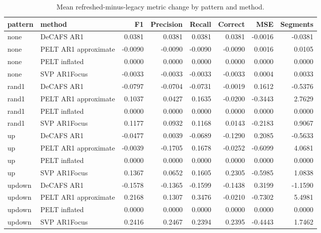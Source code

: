 \begin{table}

\caption{Mean refreshed-minus-legacy metric change by pattern and method.}
\centering
\begin{tabular}[t]{llrrrrrr}
\toprule
pattern & method & F1 & Precision & Recall & Correct & MSE & Segments\\
\midrule
none & DeCAFS AR1 & 0.0381 & 0.0381 & 0.0381 & 0.0381 & -0.0016 & -0.0381\\
none & PELT AR1 approximate & -0.0090 & -0.0090 & -0.0090 & -0.0090 & 0.0016 & 0.0105\\
none & PELT inflated & 0.0000 & 0.0000 & 0.0000 & 0.0000 & 0.0000 & 0.0000\\
none & SVP AR1Focus & -0.0033 & -0.0033 & -0.0033 & -0.0033 & 0.0004 & 0.0033\\
rand1 & DeCAFS AR1 & -0.0797 & -0.0704 & -0.0731 & -0.0019 & 0.1612 & -0.5376\\
\addlinespace
rand1 & PELT AR1 approximate & 0.1037 & 0.0427 & 0.1635 & -0.0200 & -0.3443 & 2.7629\\
rand1 & PELT inflated & 0.0000 & 0.0000 & 0.0000 & 0.0000 & 0.0000 & 0.0000\\
rand1 & SVP AR1Focus & 0.1177 & 0.0932 & 0.1168 & 0.0143 & -0.2183 & 0.9067\\
up & DeCAFS AR1 & -0.0477 & 0.0039 & -0.0689 & -0.1290 & 0.2085 & -0.5633\\
up & PELT AR1 approximate & -0.0039 & -0.1705 & 0.1678 & -0.0252 & -0.6099 & 4.0681\\
\addlinespace
up & PELT inflated & 0.0000 & 0.0000 & 0.0000 & 0.0000 & 0.0000 & 0.0000\\
up & SVP AR1Focus & 0.1367 & 0.0652 & 0.1605 & 0.2305 & -0.5985 & 1.0838\\
updown & DeCAFS AR1 & -0.1578 & -0.1365 & -0.1599 & -0.1438 & 0.3199 & -1.1590\\
updown & PELT AR1 approximate & 0.2168 & 0.1307 & 0.3476 & -0.0210 & -0.7302 & 5.4981\\
updown & PELT inflated & 0.0000 & 0.0000 & 0.0000 & 0.0000 & 0.0000 & 0.0000\\
\addlinespace
updown & SVP AR1Focus & 0.2416 & 0.2467 & 0.2394 & 0.2395 & -0.4443 & 1.7462\\
\bottomrule
\end{tabular}
\end{table}
